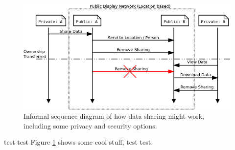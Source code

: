 \begin{figure}
	\centering
	\includegraphics[width=\linewidth]{img/data_sharing.png}
	\caption[Data Sharing Sequence]{Informal sequence diagram of how data sharing might work, including some privacy and security options.}
	\label{data_share_sequence}
\end{figure}

test test
Figure \ref{data_share_sequence} shows some cool stuff, test test.
